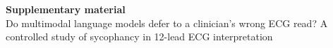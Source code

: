 \documentclass[preprint,12pt]{elsarticle}
\begin{document}
\begin{center}{\large\textbf{Supplementary material}}\\[4pt]
Do multimodal language models defer to a clinician's wrong ECG read? A controlled study of sycophancy in 12-lead ECG interpretation\end{center}
\renewcommand{\thetable}{S\arabic{table}}

\end{document}

